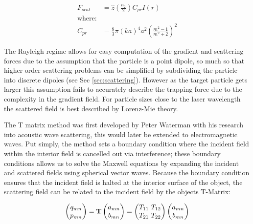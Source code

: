 \documentclass[a4paper,oneside,11pt]{book}
\begin{document}
\begin{align}
    F_{scat} &= \hat{z} \left(\frac{n_2}{2}\right) C_{pr} I(r) \\
    \text{where:} \nonumber \\
    C_{pr} &= \frac{8}{3} \pi (ka)^4 a^2 \left(\frac{m^2-1}{m^2+2}\right)^2
\end{align}

The Rayleigh regime allows for easy computation of the gradient and scattering forces due to the assumption that the particle is a point dipole, so much so that higher order scattering problems can be simplified by subdividing the particle into discrete dipoles (see Sec \ref{sec:scattering}). However as the target particle gets larger this assumption fails to accurately describe the trapping force due to the complexity in the gradient field. For particle sizes close to the laser wavelength the scattered field is best described by Lorenz-Mie theory. 

The T matrix method was first developed by Peter Waterman with his 
research into acoustic wave scattering, this would later be extended to 
electromagnetic waves. Put simply, the method sets a boundary condition 
where the incident field within the interior field is cancelled out via 
interference; these boundary conditions allows us to solve the Maxwell 
equations by expanding the incident and scattered fields using spherical 
vector waves. Because the boundary condition ensures that the incident field is halted at the interior surface of the object, the scattering field can be related to the incident field by the objects T-Matrix:

\begin{align}
    \begin{pmatrix}
    q_{mn} \\
    p_{mn} 
    \end{pmatrix}
    = \bold{T} 
    \begin{pmatrix}
        a_{mn} \\
        b_{mn}
    \end{pmatrix}
    = \begin{pmatrix}
        T_{11} \ T_{12} \\
        T_{21} \ T_{22}
    \end{pmatrix}
    \begin{pmatrix}
        a_{mn} \\
        b_{mn}
    \end{pmatrix}
\end{align}
\end{document}

